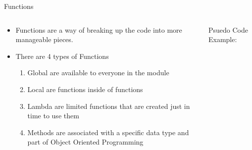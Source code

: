 
% 
% 
% 
\begin{Slide}{Functions}
  \begin{columns}
    \begin{column}{.48\textwidth}
      \tiny
      \begin{itemize}
      \item Functions are a way of breaking up the code into more manageable pieces.
      \item There are 4 types of Functions
        \begin{enumerate}
          \tiny
          \pause
        \item Global are available to everyone in the module
          \pause
        \item Local are functions inside of functions
          \pause
        \item Lambda are limited functions that are created just in time to use them
          \pause
        \item Methods are associated with a specific data type and part of Object Oriented Programming
        \end{enumerate}
      \end{itemize}
      
      
    \end{column}

    \hfill

    \begin{column}{.48\textwidth}
      \pause 
      Psuedo Code Example:
            
      \inputminted[firstline=3,
      lastline=10,
      breaklines,
      fontsize=\tiny,
      bgcolor=Background,
      linenos]{python}{../src/psuedo.py}
      
      
    \end{column}
  \end{columns}
\end{Slide}

